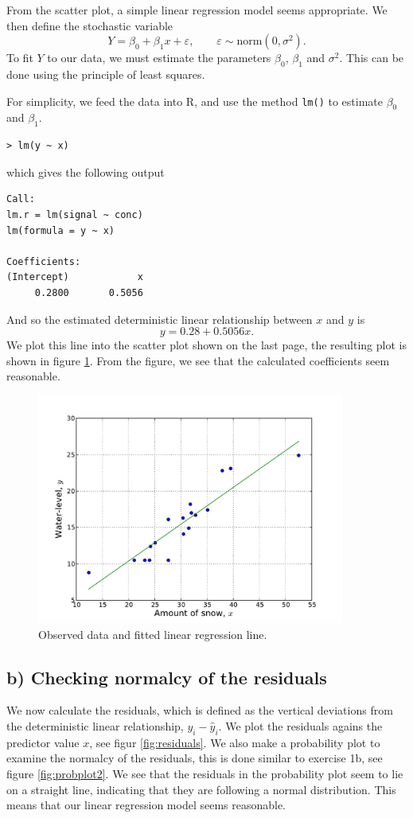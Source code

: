 \documentclass[a4paper, 11pt, titlepage]{article}
\begin{document}
From the scatter plot, a simple linear regression model seems appropriate. We then define the stochastic variable
$$Y = \beta_0 + \beta_1x + \varepsilon, \qquad \varepsilon \sim \mbox{norm}(0,\sigma^2).$$
To fit $Y$ to our data, we must estimate the parameters $\beta_0$, $\beta_1$ and $\sigma^2$. This can be done using the principle of least squares.

For simplicity, we feed the data into R, and use the method \verb+lm()+ to estimate $\beta_0$ and $\beta_1$. 
\begin{lstlisting}
> lm(y ~ x)
\end{lstlisting}
which gives the following output
\begin{lstlisting}
Call:
lm.r = lm(signal ~ conc)
lm(formula = y ~ x)

Coefficients:
(Intercept)            x  
     0.2800       0.5056  
\end{lstlisting}
And so the estimated deterministic linear relationship between $x$ and $y$ is
$$y = 0.28 + 0.5056x.$$
We plot this line into the scatter plot shown on the last page, the resulting plot is shown in figure \ref{fig:reg}. From the figure, we see that the calculated coefficients seem reasonable.

\begin{figure}[htpb]
\centering
\includegraphics[width=0.9\textwidth]{fittedreg.pdf}
\caption{Observed data and fitted linear regression line. \label{fig:reg}}
\end{figure}

\clearpage

\subsection*{b) Checking normalcy of the residuals}
We now calculate the residuals, which is defined as the vertical deviations from the deterministic linear relationship, $y_i - \hat{y}_i$. We plot the residuals agains the predictor value $x$, see figur \ref{fig:residuals}. We also make a probability plot to examine the normalcy of the residuals, this is done similar to exercise 1b, see figure \ref{fig:probplot2}. We see that the residuals in the probability plot seem to lie on a straight line, indicating that they are following a normal distribution. This means that our linear regression model seems reasonable.
\end{document}
